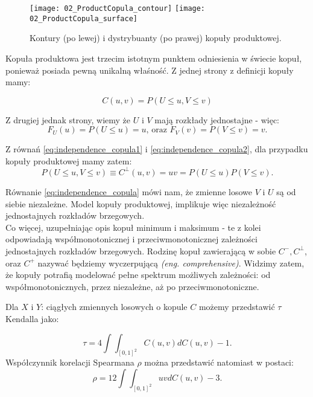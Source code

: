 \begin{figure}[h]
	\centering
	\texttt{[image: 02\_ProductCopula\_contour]}
	\texttt{[image: 02\_ProductCopula\_surface]}
	
	\caption{Kontury (po lewej) i dystrybuanty (po prawej) kopuły produktowej. \label{fig:prod_copula}}
\end{figure}

Kopuła produktowa jest trzecim istotnym punktem odniesienia w świecie kopuł, ponieważ posiada pewną unikalną właśność. Z jednej strony z definicji kopuły mamy:

\begin{equation}
C(u, v) = P(U \leqslant u, V \leqslant v )
\label{eq:independence_copula1}
\end{equation}

Z drugiej jednak strony, wiemy że $U$ i $V$ mają rozkłady jednostajne - więc:
\begin{equation}
	F_U(u) = P(U \leqslant u) = u\text{, oraz } F_V(v) = P(V \leqslant v) = v.
\label{eq:independence_copula2}
\end{equation}

Z równań \ref{eq:independence_copula1} i \ref{eq:independence_copula2}, dla przypadku kopuły produktowej mamy zatem:
\begin{equation}
	P(U \leqslant u, V \leqslant v ) \equiv C^{\perp}(u, v) = uv = P(U \leqslant u) P(V \leqslant v).
	\label{eq:independence_copula}
\end{equation}

Równanie \ref{eq:independence_copula} mówi nam, że zmienne losowe $V$ i $U$ są od siebie niezależne. Model kopuły produktowej, implikuje więc niezależność jednostajnych rozkładów brzegowych.\\
Co więcej, uzupełniając opis kopuł minimum i maksimum - te z kolei odpowiadają współmonotonicznej i przeciwmonotonicznej zależności jednostajnych rozkładów brzegowych. Rodzinę kopuł zawierającą w sobie $C^{-}, C^{\perp}$, oraz $C^{+}$ nazywać będziemy wyczerpującą \emph{(eng. comprehensive)}. Widzimy zatem, że kopuły potrafią modelować pełne spektrum możliwych zależności: od współmonotonicznych, przez niezależne, aż po przeciwmonotoniczne.\\

\begin{prop}
	Dla $X$ i $Y$: ciągłych zmiennych losowych o kopule $C$ możemy przedstawić $\tau$ Kendalla jako:
	
	\begin{equation}
		\tau = 4\int\int_{[0, 1]^2}C(u,v)dC(u,v) -1.
		\label{eq:tau_from_copula}
	\end{equation}
	Współczynnik korelacji Spearmana $\rho$ można przedstawić natomiast w postaci:
	\begin{equation}	
		\rho = 12\int\int_{[0, 1]^2}uvdC(u,v) -3.
		\label{eq:rho_from_copula}
	\end{equation}
	\label{thm:tau_from_copula}
\end{prop}

